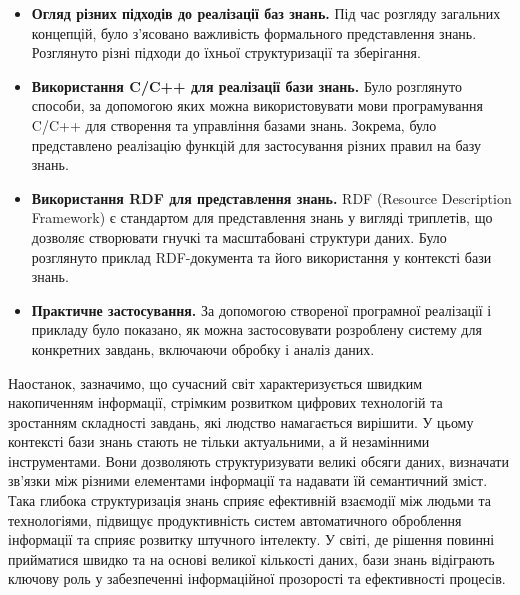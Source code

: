\documentclass[12pt, a4paper]{article}
\begin{document}
\begin{itemize}
    \item \textbf{Огляд різних підходів до реалізації баз знань.} Під час розгляду загальних концепцій, було з'ясовано важливість формального представлення знань. Розглянуто різні підходи до їхньої структуризації та зберігання.

    \item \textbf{Використання C/C++ для реалізації бази знань.} Було розглянуто способи, за допомогою яких можна використовувати мови програмування C/C++ для створення та управління базами знань. Зокрема, було представлено реалізацію функцій для застосування різних правил на базу знань.

    \item \textbf{Використання RDF для представлення знань.} RDF (Resource Description Framework) є стандартом для представлення знань у вигляді триплетів, що дозволяє створювати гнучкі та масштабовані структури даних. Було розглянуто приклад RDF-документа та його використання у контексті бази знань.

    \item \textbf{Практичне застосування.} За допомогою створеної програмної реалізації і прикладу було показано, як можна застосовувати розроблену систему для конкретних завдань, включаючи обробку і аналіз даних.
\end{itemize}

Наостанок, зазначимо, що сучасний світ характеризується швидким накопиченням інформації, стрімким розвитком цифрових технологій та зростанням складності завдань, які людство намагається вирішити. У цьому контексті бази знань стають не тільки актуальними, а й незамінними інструментами. Вони дозволяють структуризувати великі обсяги даних, визначати зв'язки між різними елементами інформації та надавати їй семантичний зміст. Така глибока структуризація знань сприяє ефективній взаємодії між людьми та технологіями, підвищує продуктивність систем автоматичного оброблення інформації та сприяє розвитку штучного інтелекту. У світі, де рішення повинні прийматися швидко та на основі великої кількості даних, бази знань відіграють ключову роль у забезпеченні інформаційної прозорості та ефективності процесів.
\end{document}
